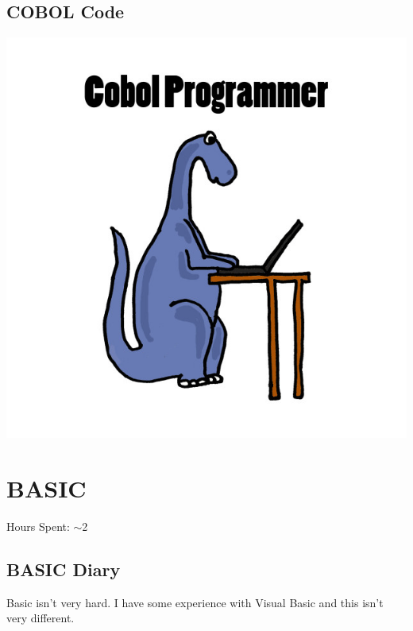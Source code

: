 \documentclass{report}
\begin{document}
\subsection*{COBOL Code}
\includegraphics{cobol}


\section*{BASIC}
Hours Spent: $\sim$2
\subsection*{BASIC Diary}
Basic isn't very hard. I have some experience with Visual Basic and this isn't very different.
\end{document}
